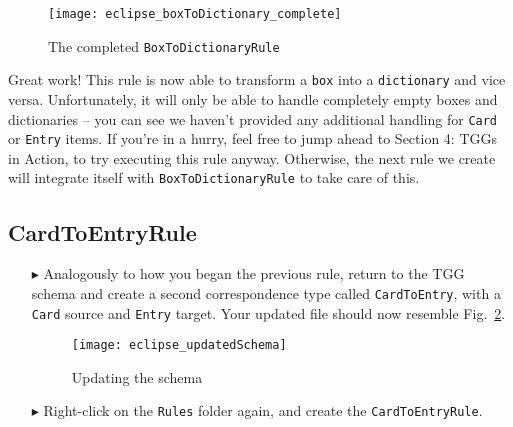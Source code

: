 \begin{figure}[htbp]
\begin{center}
  \texttt{[image: eclipse\_boxToDictionary\_complete]}
  \caption{The completed \texttt{BoxToDictionaryRule}}
  \label{eclipse:allReferences}
\end{center}
\end{figure}

\clearpage

Great work! This rule is now able to transform a \texttt{box} into a \texttt{dictionary} and vice versa. Unfortunately, it will only be able to handle
completely empty boxes and dictionaries -- you can see we haven't provided any additional handling for \texttt{Card} or \texttt{Entry} items. If you're in a
hurry, feel free to jump ahead to Section 4: TGGs in Action, to try executing this rule anyway. Otherwise, the next rule we create will integrate itself with
\texttt{Box\-To\-Dict\-ion\-ary\-Rule} to take care of this.

\subsection{CardToEntryRule}

\begin{itemize} 

\item[$\blacktriangleright$] Analogously to how you began the previous rule, return to the TGG schema and create a second correspondence type called
\texttt{CardToEntry}, with a \texttt{Card} source and \texttt{Entry} target. Your updated file should now resemble Fig.~\ref{eclipse:updatedSchema}.

\vspace{0.5cm}

\begin{figure}[htbp]
\begin{center}
  \texttt{[image: eclipse\_updatedSchema]}
  \caption{Updating the schema}
  \label{eclipse:updatedSchema}
\end{center}
\end{figure}

\item[$\blacktriangleright$] Right-click on the \texttt{Rules} folder again, and create the \texttt{CardToEntryRule}.

\end{itemize}

